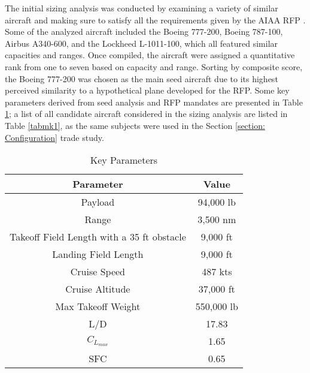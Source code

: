 The initial sizing analysis was conducted by examining a variety of similar aircraft and making sure to satisfy all the requirements given by the AIAA RFP \cite{RFP}. Some of the analyzed aircraft included the Boeing 777-200, Boeing 787-100, Airbus A340-600, and the Lockheed L-1011-100, which all featured similar capacities and ranges.  Once compiled, the aircraft were assigned a quantitative rank from one to seven based on  capacity and range. Sorting by composite score, the Boeing 777-200 was chosen as the main seed aircraft due to its highest perceived similarity to a hypothetical plane developed for the RFP. Some key parameters derived from seed analysis and RFP mandates are presented in Table \ref{tab:req}; a list of all candidate aircraft considered in the sizing analysis are listed in Table \ref{tabmk1}, as the same subjects were used in the Section \ref{section: Configuration} trade study.

\begin{table}[h!] 
    \centering
    \caption{Key Parameters}
    \begin{tabular}{ |c||c| }\toprule
    \textbf{Parameter} & \textbf{Value} \\\hline\hline
    Payload & 94,000 lb  \\\hline
    Range & 3,500 nm \\\hline
    Takeoff Field Length with a 35 ft obstacle & 9,000 ft  \\\hline
    Landing Field Length & 9,000 ft \\\hline
    Cruise Speed & 487 kts\\\hline
    Cruise Altitude & 37,000 ft \\\hline
    Max Takeoff Weight & 550,000 lb\\\hline 
    L/D & 17.83\\\hline 
    $C_{L_{max}}$ & 1.65\\\hline 
    SFC & 0.65\\\hline 

    \end{tabular}\label{tab:req}
\end{table}

